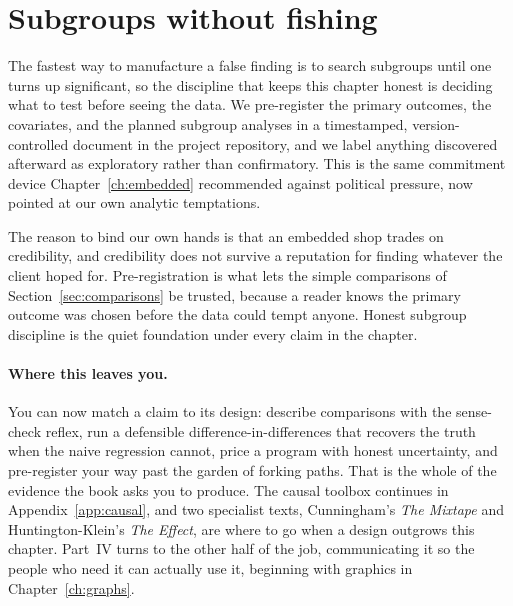 \documentclass[
    a4paper,
    fontsize=10pt,
    twoside=true,
    numbers=noenddot,
]{kaobook}
\begin{document}
\section{Subgroups without fishing}\label{sec:prereg}
The fastest way to manufacture a false finding is to search subgroups until one turns up significant, so the discipline that keeps this chapter honest is deciding what to test before seeing the data. We pre-register the primary outcomes, the covariates, and the planned subgroup analyses in a timestamped, version-controlled document in the project repository, and we label anything discovered afterward as exploratory rather than confirmatory. This is the same commitment device Chapter~\ref{ch:embedded} recommended against political pressure, now pointed at our own analytic temptations.

The reason to bind our own hands is that an embedded shop trades on credibility, and credibility does not survive a reputation for finding whatever the client hoped for. Pre-registration is what lets the simple comparisons of Section~\ref{sec:comparisons} be trusted, because a reader knows the primary outcome was chosen before the data could tempt anyone. Honest subgroup discipline is the quiet foundation under every claim in the chapter.

\paragraph{Where this leaves you.} You can now match a claim to its design: describe comparisons with the sense-check reflex, run a defensible difference-in-differences that recovers the truth when the naive regression cannot, price a program with honest uncertainty, and pre-register your way past the garden of forking paths. That is the whole of the evidence the book asks you to produce. The causal toolbox continues in Appendix~\ref{app:causal}, and two specialist texts, Cunningham's \emph{The Mixtape} and Huntington-Klein's \emph{The Effect}, are where to go when a design outgrows this chapter. Part~IV turns to the other half of the job, communicating it so the people who need it can actually use it, beginning with graphics in Chapter~\ref{ch:graphs}.
\end{document}
